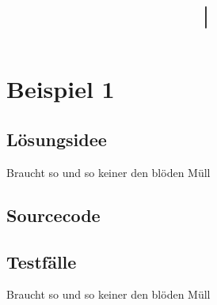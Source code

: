 \documentclass[11pt]{article}
\title{\course \space | \space \documentname}
\author{\documentauthor}
\date{\documentdate}
\begin{document}
\begin{titlepage}
	\maketitle
	\tableofcontents
\end{titlepage}

\section{Beispiel 1}
	\subsection{Lösungsidee}
	Braucht so und so keiner den blöden Müll
	\subsection{Sourcecode}
	
	\subsection{Testfälle}
    Braucht so und so keiner den blöden Müll
\end{document}
